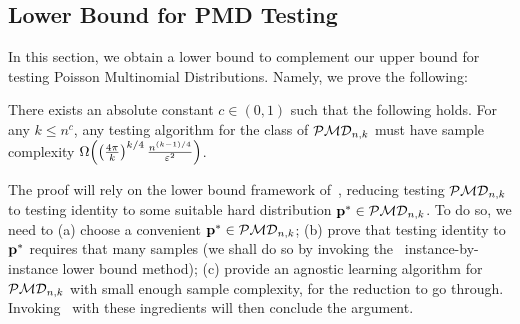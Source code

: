 \subsection{Lower Bound for PMD Testing}\label{sec:lower:bounds}
In this section, we obtain a lower bound to complement our upper bound for testing Poisson Multinomial Distributions. Namely, we prove the following:
\begin{theorem}\label{theo:lb:pmd}
  There exists an absolute constant $c\in(0,1)$ such that the following holds. For any $k\leq n^c$, any testing algorithm for the class of $\classpmd[n]{k}$ must have sample complexity
  $
    \bigOmega{ \left(\frac{4\pi}{k}\right)^{{k}/{4}}\frac{n^{{(k-1)}/{4}}}{\eps^2} }
  $.
\end{theorem}
The proof will rely on the lower bound framework of~\cite{CDGR:16}, reducing testing $\classpmd[n]{k}$ to testing identity to some suitable hard distribution $\p^\ast\in\classpmd[n]{k}$. To do so, we need to (a) choose a convenient $\p^\ast\in\classpmd[n]{k}$; (b) prove that testing identity to $\p^\ast$ requires that many samples (we shall do so by invoking the~\cite{VV:14} instance-by-instance lower bound method); (c) provide an agnostic learning algorithm for $\classpmd[n]{k}$ with small enough sample complexity, for the reduction to go through. Invoking~\cite[Theorem 18]{CDGR:16} with these ingredients will then conclude the argument.
